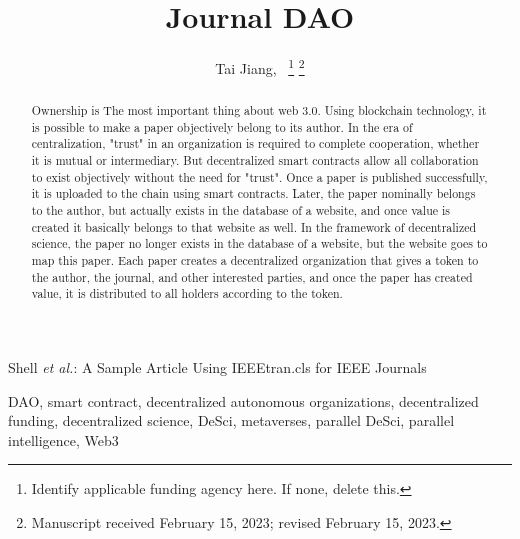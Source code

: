 \documentclass[lettersize,journal]{IEEEtran}
\begin{document}
\title{Journal DAO}

\author{Tai Jiang,~
\thanks{Identify applicable funding agency here. If none, delete this.}%
\thanks{Manuscript received February 15, 2023; revised February 15, 2023.}}

%
{Shell \MakeLowercase{\textit{et al.}}: A Sample Article Using IEEEtran.cls for IEEE Journals}


\maketitle

\begin{abstract}
Ownership is The most important thing about web 3.0. Using blockchain technology, it is possible to make a paper objectively belong to its author. In the era of centralization, "trust" in an organization is required to complete cooperation, whether it is mutual or intermediary. But decentralized smart contracts allow all collaboration to exist objectively without the need for "trust". Once a paper is published successfully, it is uploaded to the chain using smart contracts. Later, the paper nominally belongs to the author, but actually exists in the database of a website, and once value is created it basically belongs to that website as well. In the framework of decentralized science, the paper no longer exists in the database of a website, but the website goes to map this paper. Each paper creates a decentralized organization that gives a token to the author, the journal, and other interested parties, and once the paper has created value, it is distributed to all holders according to the token.
\end{abstract}

\begin{IEEEkeywords}
DAO, smart contract, decentralized autonomous organizations, decentralized funding, decentralized science, DeSci, metaverses, parallel DeSci, parallel intelligence, Web3
\end{IEEEkeywords}
\end{document}
